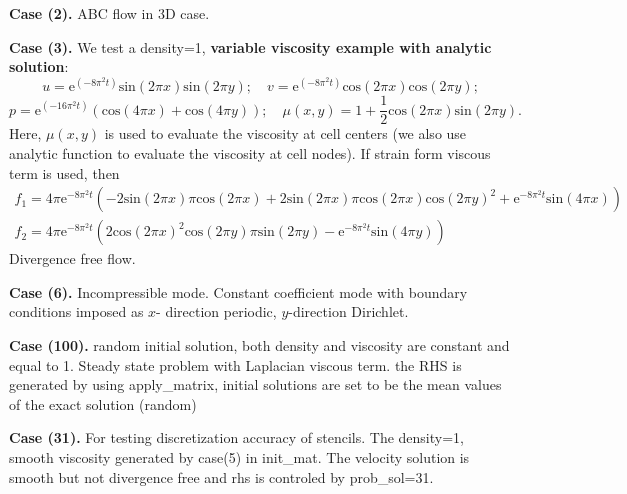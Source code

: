 \documentclass[final]{siamltex}
\begin{document}
{\bf Case (2).} ABC flow in 3D case. 

{\bf Case (3).} We test a density=1, {\bf variable viscosity example with analytic solution}: %
$$
u=\mbox{e}^{(-8\pi^2t)}\mbox{sin}(2 \pi x)\mbox{sin}(2 \pi y); \quad v=\mbox{e}^{(-8\pi^2t)}\mbox{cos}(2 \pi x)\mbox{cos}(2 \pi y);
$$
$$
p=\mbox{e}^{(-16 \pi^2 t)}(\mbox{cos}(4 \pi x)+\mbox{cos}(4 \pi y));
\quad
\mu(x,y)=1+\frac{1}{2} \mbox{cos}(2 \pi x) \mbox{sin}(2 \pi y).
$$
Here, $\mu(x,y)$ is used to evaluate the viscosity at cell centers (we also use analytic function to evaluate the viscosity at cell nodes).
If strain form viscous term is used, then 
$$
\begin{array} {ll}
f_1=4 \pi \mbox{e}^{-8 \pi^2 t} (-2 \mbox{sin}(2 \pi x) \pi \mbox{cos}(2 \pi x)+2 \mbox{sin}(2 \pi x) \pi \mbox{cos}(2 \pi x) \mbox{cos}(2 \pi y)^2+\mbox{e}^{-8 \pi^2 t} \mbox{sin}(4 \pi x))
\\
f_2=4 \pi \mbox{e}^{-8 \pi^2 t} (2 \mbox{cos}(2 \pi x)^2 \mbox{cos}(2 \pi y) \pi \mbox{sin}(2 \pi y)-\mbox{e}^{-8 \pi^2 t} \mbox{sin}(4 \pi y))
\end{array}
$$
Divergence free flow.

{\bf Case (6).} Incompressible mode. Constant coefficient mode with boundary conditions imposed as $x$- direction periodic, $y$-direction Dirichlet.


{\bf Case (100).} random initial solution, both density and viscosity are constant and equal to 1. Steady state problem with Laplacian viscous term.
the RHS is generated by using apply\_matrix, initial solutions are set to be the mean values of the exact solution (random) 


{\bf Case (31).} For testing discretization accuracy of stencils. The density=1, smooth viscosity generated by case(5) in init\_mat. 
The velocity solution is smooth but not divergence free and rhs is controled by prob\_sol=31. 
\end{document}
